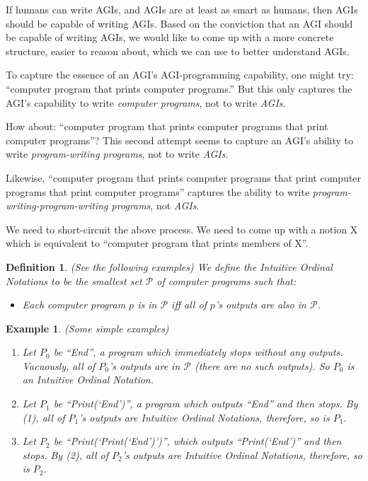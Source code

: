 \documentclass[runningheads]{llncs}
\newtheorem{myexample}[mytheorem]{Example}
\newtheorem{mydefinition}[mytheorem]{Definition}
\begin{document}
If humans can write AGIs, and AGIs are at least as smart as humans,
then AGIs should be capable of writing AGIs.
Based on the conviction that an AGI should be capable of writing AGIs,
we would like to come up with a more concrete structure, easier to reason
about, which we can use to better understand AGIs.

To capture the essence of an AGI's AGI-programming
capability, one might try: ``computer
program that prints computer programs.'' But this only
captures the
AGI's capability to write \emph{computer programs}, not to write \emph{AGIs}.

How
about: ``computer program that prints computer programs that print
computer programs''? This second attempt
seems to capture an AGI's ability to write \emph{program-writing programs},
not to write \emph{AGIs}.

Likewise, ``computer program that prints computer programs that print computer
programs that print computer programs'' captures the ability to write
\emph{program-writing-program-writing programs}, not \emph{AGIs}.

We need to short-circuit the above process. We need to come up with a notion
X which is equivalent to ``computer program that prints members of X''.

\begin{mydefinition}
\label{literalnotationdef}
    (See the following examples)
    We define the Intuitive Ordinal Notations to be the smallest set $\mathcal P$
    of computer programs such that:
    \begin{itemize}
        \item
            Each computer program $p$ is in $\mathcal P$ iff all of
            $p$'s outputs are also in $\mathcal P$.
    \end{itemize}
\end{mydefinition}

\begin{myexample}
\label{simpleexamples}
(Some simple examples)
    \begin{enumerate}
    \item
    Let $P_0$ be ``End'', a program which immediately stops without any outputs.
    Vacuously, all of $P_0$'s outputs are in $\mathcal P$
    (there are no such outputs). So $P_0$ is an Intuitive Ordinal Notation.
    \item
    Let $P_1$ be ``Print(`End')'', a program which outputs ``End'' and then
    stops. By (1), all of $P_1$'s outputs are Intuitive Ordinal Notations,
    therefore, so is $P_1$.
    \item
    Let $P_2$ be ``Print(`Print(`End')')'', which outputs ``Print(`End')'' and then
    stops. By (2), all of $P_2$'s outputs are Intuitive Ordinal Notations,
    therefore, so is $P_2$.
    \end{enumerate}
\end{myexample}
\end{document}
